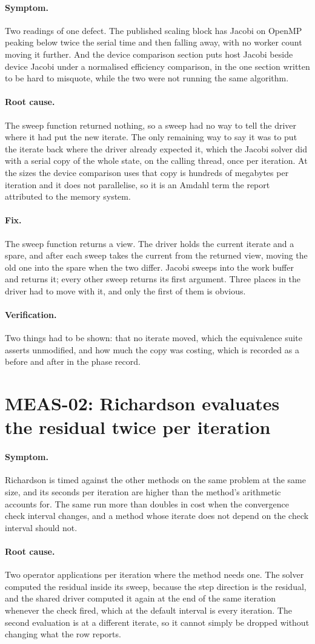 \documentclass[11pt,a4paper]{report}
\newcommand{\symptom}[1]{\paragraph{Symptom.}#1}
\newcommand{\rootcause}[1]{\paragraph{Root cause.}#1}
\newcommand{\fix}[1]{\paragraph{Fix.}#1}
\newcommand{\verification}[1]{\paragraph{Verification.}#1}
\begin{document}
\symptom{Two readings of one defect. The published scaling block has Jacobi on
OpenMP peaking below twice the serial time and then falling away, with no worker
count moving it further. And the device comparison section puts host Jacobi
beside device Jacobi under a normalised efficiency comparison, in the one section
written to be hard to misquote, while the two were not running the same
algorithm.}

\rootcause{The sweep function returned nothing, so a sweep had no way to tell the
driver where it had put the new iterate. The only remaining way to say it was to
put the iterate back where the driver already expected it, which the Jacobi
solver did with a serial copy of the whole state, on the calling thread, once per
iteration. At the sizes the device comparison uses that copy is hundreds of
megabytes per iteration and it does not parallelise, so it is an Amdahl term the
report attributed to the memory system.}

\fix{The sweep function returns a view. The driver holds the current iterate and
a spare, and after each sweep takes the current from the returned view, moving
the old one into the spare when the two differ. Jacobi sweeps into the work
buffer and returns it; every other sweep returns its first argument. Three places
in the driver had to move with it, and only the first of them is obvious.}

\verification{Two things had to be shown: that no iterate moved, which the
equivalence suite asserts unmodified, and how much the copy was costing, which is
recorded as a before and after in the phase record.}

\section{MEAS-02: Richardson evaluates the residual twice per iteration}

\symptom{Richardson is timed against the other methods on the same problem at the
same size, and its seconds per iteration are higher than the method's arithmetic
accounts for. The same run more than doubles in cost when the convergence check
interval changes, and a method whose iterate does not depend on the check
interval should not.}

\rootcause{Two operator applications per iteration where the method needs one.
The solver computed the residual inside its sweep, because the step direction is
the residual, and the shared driver computed it again at the end of the same
iteration whenever the check fired, which at the default interval is every
iteration. The second evaluation is at a different iterate, so it cannot simply
be dropped without changing what the row reports.}
\end{document}

